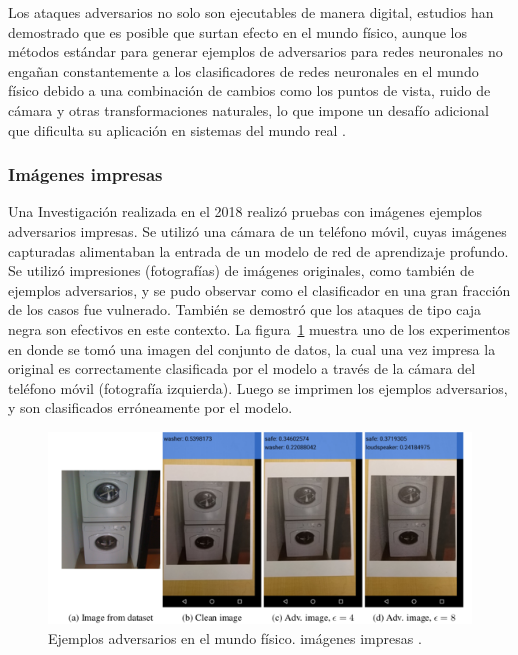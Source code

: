 Los ataques adversarios no solo son ejecutables de manera digital, estudios \parencite{r51, r52, r54, r56} han demostrado que es posible que surtan efecto en el mundo físico, aunque los métodos estándar para generar ejemplos de adversarios para redes neuronales no engañan constantemente a los clasificadores de redes neuronales en el mundo físico debido a una combinación de cambios como los puntos de vista, ruido de cámara y otras transformaciones naturales, lo que impone un desafío adicional que dificulta su aplicación en sistemas del mundo real \parencite{r52}.

\subsubsection{Imágenes impresas}

Una Investigación realizada en el 2018 realizó pruebas con imágenes ejemplos adversarios impresas. Se utilizó una cámara de un teléfono móvil, cuyas imágenes capturadas alimentaban la entrada de un modelo de red de aprendizaje profundo. Se utilizó impresiones (fotografías) de imágenes originales, como también de ejemplos adversarios, y se pudo observar como el clasificador en una gran fracción de los casos fue vulnerado. También se demostró que los ataques de tipo caja negra son efectivos en este contexto. La figura~\ref{fig:23} muestra uno de los experimentos en donde se tomó una imagen del conjunto de datos, la cual una vez impresa la original es correctamente clasificada por el modelo a través de la cámara del teléfono móvil (fotografía izquierda). Luego se imprimen los ejemplos adversarios, y son clasificados erróneamente por el modelo.

\begin{figure}[th]
\centering
\includegraphics [scale = 1] {Figures/figura_23.PNG}
\decoRule
\caption[Mundo físico]{Ejemplos adversarios en el mundo físico. imágenes impresas \parencite{r51}.}
\label{fig:23}
\end{figure}

